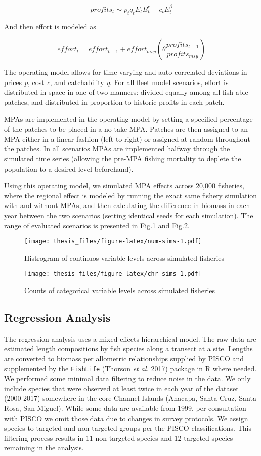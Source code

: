 \documentclass[twoside,12pt,final]{ucthesis-CA2012}
\begin{document}
\begin{ucmainmatter}
\[profits_{t} \sim p_{t}q_{t}E_{t}B^{c}_{t} - c_{t}E_{t}^{\beta}\]

And then effort is modeled as

\[effort_{t} = effort_{t-1} + effort_{msy}(\theta\frac{profits_{t-1}}{profits_{msy}})\]

The operating model allows for time-varying and auto-correlated
deviations in prices \emph{p}, cost \emph{c}, and catchability \emph{q}.
For all fleet model scenarios, effort is distributed in space in one of
two manners: divided equally among all fish-able patches, and
distributed in proportion to historic profits in each patch.

MPAs are implemented in the operating model by setting a specified
percentage of the patches to be placed in a no-take MPA. Patches are
then assigned to an MPA either in a linear fashion (left to right) or
assigned at random throughout the patches. In all scenarios MPAs are
implemented halfway through the simulated time series (allowing the
pre-MPA fishing mortality to deplete the population to a desired level
beforehand).

Using this operating model, we simulated MPA effects across 20,000
fisheries, where the regional effect is modeled by running the exact
same fishery simulation with and without MPAs, and then calculating the
difference in biomass in each year between the two scenarios (setting
identical seeds for each simulation). The range of evaluated scenarios
is presented in Fig.\ref{fig:num-sims} and Fig.\ref{fig:chr-sims}.
\begin{figure}
\centering
\texttt{[image: thesis\_files/figure-latex/num-sims-1.pdf]}
\caption{\label{fig:num-sims}Histrogram of continuos variable levels across
simulated fisheries}
\end{figure}
\begin{figure}
\centering
\texttt{[image: thesis\_files/figure-latex/chr-sims-1.pdf]}
\caption{\label{fig:chr-sims}Counts of categorical variable levels across
simulated fisheries}
\end{figure}
\subsection{Regression Analysis}\label{regression-analysis}

The regression analysis uses a mixed-effects hierarchical model. The raw
data are estimated length compositions by fish species along a transect
at a site. Lengths are converted to biomass per allometric relationships
supplied by PISCO and supplemented by the \texttt{FishLife} (Thorson
\emph{et al.} \protect\hyperlink{ref-Thorson2017d}{2017}) package in R
where needed. We performed some minimal data filtering to reduce noise
in the data. We only include species that were observed at least twice
in each year of the dataset (2000-2017) somewhere in the core Channel
Islands (Anacapa, Santa Cruz, Santa Rosa, San Miguel). While some data
are available from 1999, per consultation with PISCO we omit those data
due to changes in survey protocols. We assign species to targeted and
non-targeted groups per the PISCO classifications. This filtering
process results in 11 non-targeted species and 12 targeted species
remaining in the analysis.


\end{ucmainmatter}
\end{document}
